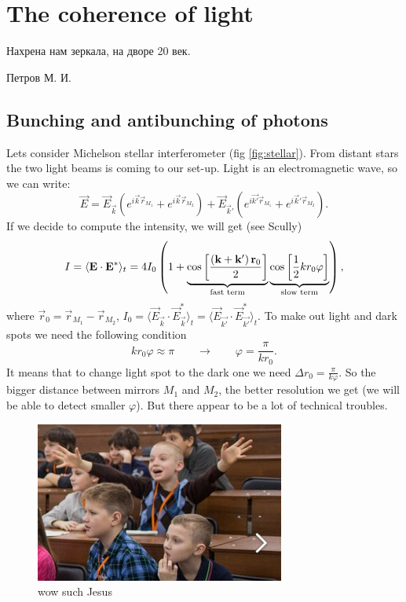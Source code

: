 \section{The coherence of light}

\begin{otherlanguage}{russian}
	\epigraph{Нахрена нам зеркала, на дворе 20 век.}{Петров М. И.}
\end{otherlanguage}

\subsection{Bunching and antibunching of photons}

Lets consider Michelson stellar interferometer (fig \ref{fig:stellar}). From distant stars the two light beams is coming to our set-up. Light is an electromagnetic wave, so we can write:
\begin{equation}
	\vec{E} = \vec{E}_{\vec{k}} \left( e^{i \vec{k} \vec{r}_{M_1}}  + e^{i \vec{k} \vec{r}_{M_2}} \right) + \vec{E}_{\vec{k}'} \left( e^{i \vec{k'} \vec{r}_{M_1}} + e^{i \vec{k}' \vec{r}_{M_2}} \right).
\end{equation}
If we decide to compute the intensity, we will get (see Scully)
\begin{equation}
	I = \langle \mathbf{E} \cdot \mathbf{E}^* \rangle_t  = 4 I_0 \left( 1 + \underbrace{\cos \left[\frac{\left( \mathbf{k} + \mathbf{k}' \right) \mathbf{r}_0}{2}\right]}_{\text{fast term}} \underbrace{\cos \left[\frac{1}{2}  k r_0 \varphi \right]}_{\text{slow term}} \right),
\end{equation}
where $\vec{r}_0 = \vec{r}_{M_1} - \vec{r}_{M_2}$, $I_0=\langle \vec{E}_{\vec{k}} \cdot \vec{E}_{\vec{k}}^* \rangle_t=\langle \vec{E}_{\vec{k'}} \cdot \vec{E}_{\vec{k'}}^* \rangle_t$. To make out light and dark spots we need the following condition
\begin{equation}
	k r_0 \varphi \approx \pi \qquad \to \qquad \varphi = \frac{\pi}{k r_0}.
\end{equation}
It means that to change light spot to the dark one  we need $\Delta r_0 = \frac{\pi}{k \varphi}$. So the bigger distance between mirrors $M_1$ and $M_2$, the better resolution we get (we will be able to detect smaller $\varphi$). But there appear to be a lot of technical troubles.
\begin{figure}
	\centering
	\includegraphics[width=0.5\linewidth]{fig/L3/Ij8NUO6Gat0}
	\caption{wow such Jesus}
	\label{fig:jesus}
\end{figure}

